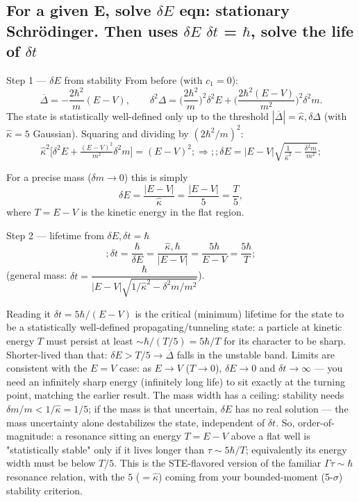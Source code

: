 \documentclass[twoside]{article}
\numberwithin{equation}{section}
\begin{document}
\subsection{For a given E, solve $\delta E$ {eqn: stationary Schrödinger}. Then uses $\delta E$ $\delta t$ = $\hbar$, solve the life of $\delta t$}

Step 1 — $\delta E$ from stability
From before (with $c_1=0$):
$$\overline{\Delta}=-\frac{2\hbar^2}{m}(E-V),\qquad \delta^2\Delta=\Big(\frac{2\hbar^2}{m}\Big)^2\delta^2 E+\Big(\frac{2\hbar^2(E-V)}{m^2}\Big)^2\delta^2 m .$$
The state is statistically well-defined only up to the threshold $|\overline{\Delta}|=\hat\kappa,\delta\Delta$ (with $\hat\kappa=5$ Gaussian). Squaring and dividing by $(2\hbar^2/m)^2$:
$$\hat\kappa^2\Big[\delta^2 E+\tfrac{(E-V)^2}{m^2}\delta^2 m\Big]=(E-V)^2
;\Longrightarrow;
\boxed{;\delta E=|E-V|\sqrt{\tfrac{1}{\hat\kappa^2}-\tfrac{\delta^2 m}{m^2}};}$$

For a precise mass ($\delta m\to0$) this is simply
$$\delta E=\frac{|E-V|}{\hat\kappa}=\frac{|E-V|}{5}=\frac{T}{5},$$
where $T=E-V$ is the kinetic energy in the flat region.

Step 2 — lifetime from $\delta E,\delta t=\hbar$
$$\boxed{;\delta t=\frac{\hbar}{\delta E}=\frac{\hat\kappa,\hbar}{|E-V|}=\frac{5\hbar}{E-V}=\frac{5\hbar}{T};}$$
(general mass: $\delta t=\dfrac{\hbar}{|E-V|\sqrt{1/\hat\kappa^2-\delta^2m/m^2}}$).

Reading it
$\delta t=5\hbar/(E-V)$ is the critical (minimum) lifetime for the state to be a statistically well-defined propagating/tunneling state: a particle at kinetic energy $T$ must persist at least $\sim\hbar/(T/5)=5\hbar/T$ for its character to be sharp. Shorter-lived than that: $\delta E>T/5 \longrightarrow\overline{\Delta}$ falls in the unstable band.
Limits are consistent with the $E=V$ case: as $E\to V$ ($T\to0$), $\delta E\to0$ and $\delta t\to\infty$ — you need an infinitely sharp energy (infinitely long life) to sit exactly at the turning point, matching the earlier result.
The mass width has a ceiling: stability needs $\delta m/m<1/\hat\kappa=1/5$; if the mass is that uncertain, $\delta E$ has no real solution — the mass uncertainty alone destabilizes the state, independent of $\delta t$.
So, order-of-magnitude: a resonance sitting an energy $T=E-V$ above a flat well is "statistically stable" only if it lives longer than $\tau\sim 5\hbar/T$; equivalently its energy width must be below $T/5$. This is the STE-flavored version of the familiar $\Gamma\tau\sim\hbar$ resonance relation, with the $5$ ($=\hat\kappa$) coming from your bounded-moment (5-$\sigma$) stability criterion.
\end{document}
